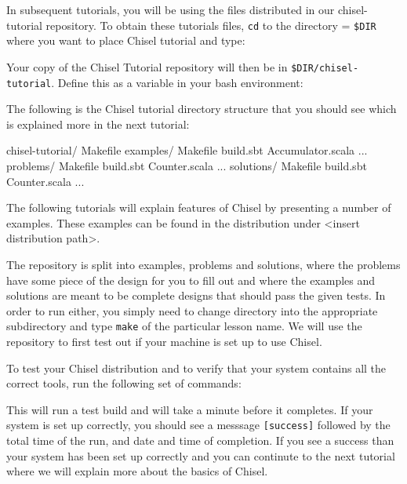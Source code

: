 \documentclass[twocolumn, 10pt]{article}
\begin{document}
In subsequent tutorials, you will be using the files distributed in our chisel-tutorial repository. To obtain these tutorials files, \verb+cd+ to the directory = \verb+$DIR+ where you want to place Chisel tutorial and type:


\noindent
Your copy of the Chisel Tutorial repository will then be in \verb+$DIR/chisel-tutorial+.  Define this as a variable in your bash environment:

The following is the Chisel tutorial directory structure that you should see which is explained more in the next tutorial:

\begin{bash}
chisel-tutorial/  
  Makefile
  examples/
    Makefile
    build.sbt
    Accumulator.scala ...
  problems/
    Makefile
    build.sbt
    Counter.scala ...
  solutions/
    Makefile
    build.sbt
    Counter.scala ...
\end{bash}

\noindent 

The following tutorials will explain features of Chisel by presenting a number of examples. These examples can be found in the distribution under <insert distribution path>.

The repository is split into examples, problems and solutions, where the problems have some piece of the design for you to fill out and where the examples and solutions are meant to be complete designs that should pass the given tests.  In order to run either, you simply need to change directory into the appropriate subdirectory and type \verb+make+ of the particular lesson name. We will use the repository to first test out if your machine is set up to use Chisel.

To test your Chisel distribution and to verify that your system contains all the correct tools, run the following set of commands:


This will run a test build and will take a minute before it completes. If your system is set up correctly, you should see a messsage \verb+[success]+ followed by the total time of the run, and date and time of completion. If you see a success than your system has been set up correctly and you can continute to the next tutorial where we will explain more about the basics of Chisel.
\end{document}
